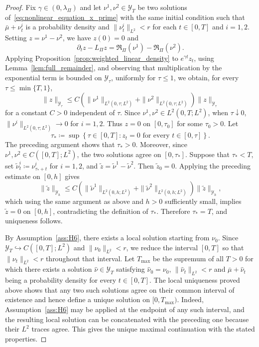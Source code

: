 \documentclass[11pt]{article}
\numberwithin{equation}{section}
\theoremstyle{definition}
\begin{document}
\begin{proof}
    Fix $\gamma \in (0, \lambda_\Pi)$ and let $\nu^1, \nu^2 \in \mathcal{Y}_T$ be two solutions of~\eqref{eq:nonlinear_equation_x_prime} with the same initial condition such that $\bar\mu + \nu^{i}_t$ is a probability density and $\|\nu^i_t\|_{L^2} < r$ for each $t \in [0,T]$ and $i = 1, 2$.
    Setting $z = \nu^1 - \nu^2$, we have $z(0) = 0$ and
    \[
    \partial_t z - L_\Pi z = \mathfrak{R}_\Pi(\nu^1) - \mathfrak{R}_\Pi(\nu^2).
    \]
    Applying Proposition~\ref{prop:weighted_linear_density} to $e^{\gamma t} z_t$, using Lemma~\ref{lem:full_remainder}, and observing that multiplication by the exponential term is bounded on $\mathcal{Y}_\tau$, uniformly for $\tau \le 1$, we obtain, for every $\tau \le \min\{T, 1\}$, 
    \[
    \|z\|_{\mathcal{Y}_\tau} \le C \left(\|\nu^1\|_{L^2(0, \tau; L^2)} + \|\nu^2\|_{L^2(0, \tau; L^2)} \right) \|z\|_{\mathcal{Y}_\tau}
    \]
    for a constant $C > 0$ independent of $\tau$.
    Since $\nu^1, \nu^2 \in L^2(0, T; L^2)$, when $\tau \downarrow 0$, $\|\nu^i\|_{L^2(0, \tau; L^2)} \to 0$ for $i=1,2$.
    Thus $z = 0$ on $[0, \tau_0]$ for some $\tau_0 > 0$.
    Let
    \[
    \tau_* \coloneqq \sup \left\{\tau \in [0,T]: z_t = 0 \text{ for every } t \in [0,\tau]\right\}.
    \]
    The preceding argument shows that $\tau_* > 0$.
    Moreover, since $\nu^1, \nu^2 \in C([0,T]; L^2)$, the two solutions agree on $[0,\tau_*]$. 
    Suppose that $\tau_* < T$, set $\widetilde{\nu}^i_t \coloneqq \nu^i_{\tau_* + t}$ for $i=1,2$, and $\widetilde{z} = \widetilde{\nu}^1 - \widetilde{\nu}^2$.
    Then $\widetilde{z}_0 = 0$. 
    Applying the preceding estimate on $[0,h]$ gives
    \[
    \|\widetilde{z}\|_{\mathcal{Y}_h} \le C \left(\|\widetilde{\nu}^1\|_{L^2(0, h; L^2)} + \|\widetilde{\nu}^2\|_{L^2(0, h; L^2)} \right) \|\widetilde{z}\|_{\mathcal{Y}_h},
    \]
    which using the same argument as above and $h > 0$ sufficiently small, implies $\widetilde{z} = 0$ on $[0,h]$, contradicting the definition of $\tau_*$. 
    Therefore $\tau_* = T$, and uniqueness follows.

    By Assumption~\ref{ass:H6}, there exists a local solution starting from $\nu_0$.
    Since $\mathcal{Y}_T \hookrightarrow C([0,T]; L^2)$ and $\|\nu_0\|_{L^2} < r$, we reduce the interval $[0,T]$ so that $\|\nu_t\|_{L^2} < r$ throughout that interval.
    Let $T_{\max}$ be the supremum of all $T > 0$ for which there exists a solution $\widehat{\nu} \in \mathcal{Y}_T$ satisfying $\widehat{\nu}_0 = \nu_0$, $\|\widehat{\nu}_t\|_{L^2} < r$ and $\bar\mu + \widehat{\nu}_t$ being a probability density for every $t \in [0,T]$.
    The local uniqueness proved above shows that any two such solutions agree on their common interval of existence and hence define a unique solution on $[0, T_{\max})$.
    Indeed, Assumption~\ref{ass:H6} may be applied at the endpoint of any such interval, and the resulting local solution can be concatenated with the preceding one because their $L^2$ traces agree.
    This gives the unique maximal continuation with the stated properties.


\end{proof}
\end{document}
